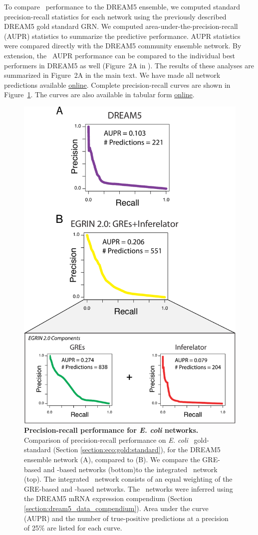 To compare \egrine\ performance to the DREAM5 ensemble, we computed
standard precision-recall statistics for each network using the
previously described DREAM5 gold standard GRN.  We computed
area-under-the-precision-recall (AUPR) statistics to summarize the
predictive performance. AUPR statistics were compared directly with
the DREAM5 community ensemble network. By extension, the \egrine~AUPR
performance can be compared to the individual best performers in
DREAM5 as well (Figure~2A in \cite{Marbach2012}). The results of these
analyses are summarized in Figure~2A in the main text. We have made
all network predictions available
\href{http://egrin2.systemsbiology.net/}{online}. Complete
precision-recall curves are shown in Figure~\ref{fig:pr_curves}. The
curves are also available in tabular form
\href{http://egrin2.systemsbiology.net/}{online}.

\begin{figure}[h!]
\centering
\includegraphics[width=0.5\linewidth]{figures/aupr.pdf}
\caption[Precision-recall performance for {\it E. coli}
  networks.]{\textbf{Precision-recall performance for \textit{E. coli}
    networks.} Comparison of precision-recall performance on {\it
    E. coli} \rdb~gold-standard (Section
  \ref{section:eco:gold:standard}), for the DREAM5 ensemble network
  (A), compared to \egrine (B).  We compare the GRE-based and
  \nwinf-based networks (bottom)to the integrated \egrine~network
  (top). The integrated \egrine~network consists of an equal weighting
  of the GRE-based and \nwinf-based networks.  The \egrine~networks
  were inferred using the DREAM5 mRNA expression compendium (Section
  \ref{section:dream5_data_compendium}). Area under the curve (AUPR)
  and the number of true-positive predictions at a precision of 25\%
  are listed for each curve.}
\label{fig:pr_curves}
\end{figure}

